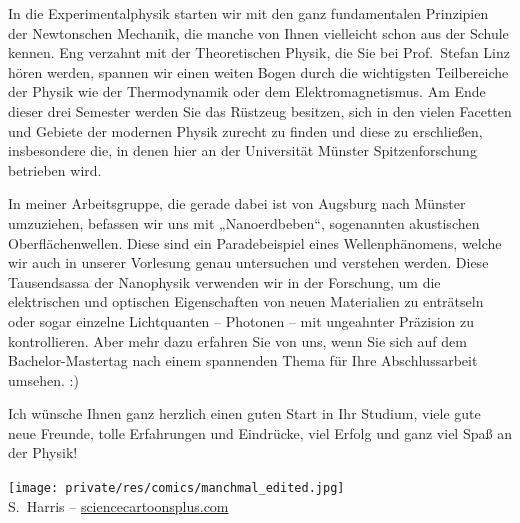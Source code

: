 \begin{multicols}{2}
In die Experimentalphysik starten wir mit den ganz fundamentalen Prinzipien der Newtonschen Mechanik, die manche von Ihnen vielleicht schon aus der Schule kennen. Eng verzahnt mit der Theoretischen Physik, die Sie bei Prof.\ Stefan Linz hören werden, spannen wir einen weiten Bogen durch die wichtigsten Teilbereiche der Physik wie der Thermodynamik oder dem Elektromagnetismus. Am Ende dieser drei Semester werden Sie das Rüstzeug besitzen, sich in den vielen Facetten und Gebiete der modernen Physik zurecht zu finden und diese zu erschließen, insbesondere die, in denen hier an der Universität Münster Spitzenforschung betrieben wird.

In meiner Arbeitsgruppe, die gerade dabei ist von Augsburg nach Münster umzuziehen, befassen wir uns mit „Nanoerdbeben“, sogenannten akustischen Oberflächenwellen. Diese sind ein Paradebeispiel eines Wellenphänomens, welche wir auch in unserer Vorlesung genau untersuchen und verstehen werden. Diese Tausendsassa der Nanophysik verwenden wir in der Forschung, um die elektrischen und optischen Eigenschaften von neuen Materialien zu enträtseln oder sogar einzelne Lichtquanten -- Photonen -- mit ungeahnter Präzision zu kontrollieren. Aber mehr dazu erfahren Sie von uns, wenn Sie sich auf dem Bachelor-Mastertag nach einem spannenden Thema für Ihre Abschlussarbeit umsehen. :)

Ich wünsche Ihnen ganz herzlich einen guten Start in Ihr Studium, viele gute neue Freunde, tolle Erfahrungen und Eindrücke, viel Erfolg und ganz viel Spaß an der Physik!

\begin{center}
\texttt{[image: private/res/comics/manchmal\_edited.jpg]}\\
{\footnotesize 
S.~Harris – \url{sciencecartoonsplus.com}
}
\end{center}

\end{multicols}

\vfill

\newpage

